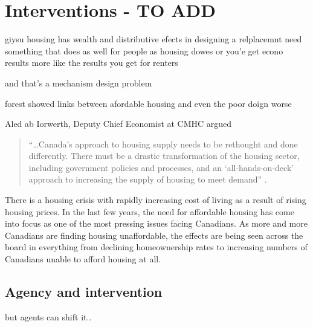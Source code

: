 \chapter{Interventions - TO ADD} \label{chapter-interventions}

giysu
housing has wealth and distributive efects
in designing a relplacemnt
need something that does as well for people as housing dowes
or you'e get econo results more like the results you get for renters

and that's a mechanism design problem


forest showed links between afordable housing and even the poor doign worse




Aled ab Iorwerth, Deputy Chief Economist at CMHC argued
\begin{quotation}
     ``\dots Canada's approach to housing supply needs to be rethought and done differently. There must be a drastic transformation of the housing sector, including government policies and processes, and an `all-hands-on-deck' approach to increasing the supply of housing to meet demand'' \cite{CanadaHousingSupply2022}.
\end{quotation}

There is a housing crisis with rapidly increasing cost of living as a result of rising housing prices. 
In the last few years, the need for affordable housing has come into focus as one of the most pressing issues facing Canadians. As more and more Canadians are finding housing unaffordable, the effects are being seen across the board in everything from declining homeownership rates to increasing numbers of Canadians unable to afford housing at all.

\section{Agency and intervention}
 but agents can shift it..

